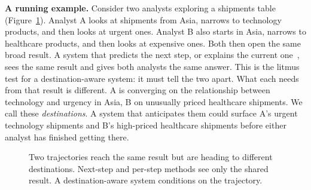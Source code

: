 \documentclass[sigconf]{acmart}
\begin{document}
\textbf{A running example.}
Consider two analysts exploring a shipments table (Figure~\ref{fig:example}). Analyst A looks at shipments from Asia, narrows to technology products, and then looks at urgent ones. Analyst B also starts in Asia, narrows to healthcare products, and then looks at expensive ones. Both then open the same broad result. A system that predicts the next step, or explains the current one~\cite{deutchFEDEXExplainabilityFramework2022}, sees the same result and gives both analysts the same answer. This is the litmus test for a destination-aware system: it must tell the two apart. What each needs from that result is different. A is converging on the relationship between technology and urgency in Asia, B on unusually priced healthcare shipments. We call these \emph{destinations}. A system that anticipates them could surface A's urgent technology shipments and B's high-priced healthcare shipments before either analyst has finished getting there.

\begin{figure}[t]
\centering
{}
\caption{Two trajectories reach the same result but are heading to different destinations. Next-step and per-step methods see only the shared result. A destination-aware system conditions on the trajectory.}
\label{fig:example}
\end{figure}
\end{document}
